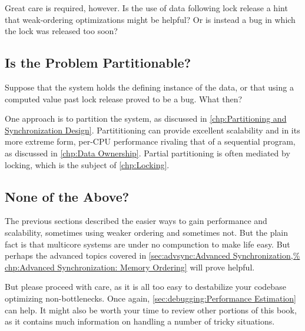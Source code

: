 Great care is required, however.
Is the use of data following lock release a hint that weak-ordering
optimizations might be helpful?
Or is instead a bug in which the lock was released too soon?

\subsection{Is the Problem Partitionable?}
\label{sec:app:questions:Is the Problem Partitionable?}

Suppose that the system holds the defining instance of the data,
or that using a computed value past lock release proved to be a bug.
What then?

One approach is to partition the system, as discussed in
\cref{chp:Partitioning and Synchronization Design}.
Partititioning can provide excellent scalability and in its more
extreme form, per-CPU performance rivaling that of a sequential program,
as discussed in \cref{chp:Data Ownership}.
Partial partitioning is often mediated by locking, which is the subject of
\cref{chp:Locking}.

\subsection{None of the Above?}
\label{sec:app:questions:None of the Above?}

The previous sections described the easier ways to gain performance
and scalability, sometimes using weaker ordering and sometimes not.
But the plain fact is that multicore systems are under no compunction
to make life easy.
But perhaps the advanced topics covered in
\cref{sec:advsync:Advanced Synchronization,%
chp:Advanced Synchronization: Memory Ordering}
will prove helpful.

But please proceed with care, as it is all too easy to destabilize
your codebase optimizing non-bottlenecks.
Once again, \cref{sec:debugging:Performance Estimation} can help.
It might also be worth your time to review other portions of this
book, as it contains much information on handling a number of tricky
situations.
